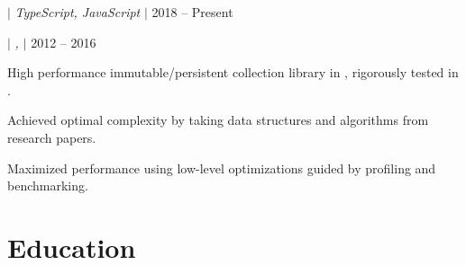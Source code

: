 \documentclass[a4paper,11pt]{article}
\begin{document}
\begin{sectionList}
\begin{project}{\textbf{\parjs} $|$ \emph{TypeScript, JavaScript} $|$ }{2018 -- Present}
    \end{project}
    \begin{project}{\textbf{\imms} $|$ \emph{, } $|$ }{2012 -- 2016}
        \item High performance immutable/persistent collection library in , rigorously tested in .
        \item Achieved optimal complexity by taking data structures and algorithms from research papers.
        \item Maximized performance using low-level optimizations guided by profiling and benchmarking.
    \end{project}
\end{sectionList}%

\section{Education}
\begin{sectionList}
    \begin{eduTechnion}
    \end{eduTechnion}
\end{sectionList}%
\end{document}
